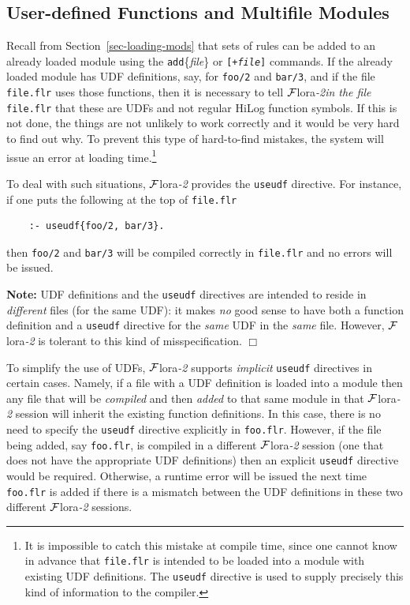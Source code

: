 \documentclass[11pt]{article}
\newcommand{\FLORA}{{\mbox{\sc ${\cal F}${lora}\rm\emph{-2}}}\xspace}
\newcommand{\FLSYSTEM}{\FLORA}
\newcommand{\flrext}{flr\xspace}
\begin{document}
\subsection{User-defined Functions and Multifile Modules}

Recall from Section~\ref{sec-loading-mods} that sets of rules can be added to 
an already loaded module using the \texttt{add}\{\emph{file}\}
or \texttt{[+\textnormal{\emph{file}}]}
commands.  
If the already loaded module has UDF definitions, say, for \texttt{foo/2}
and \texttt{bar/3}, and if 
the file \texttt{file.\flrext} uses those functions, then it is necessary to
tell \FLSYSTEM \emph{in the file}   \texttt{file.\flrext} that these are UDFs and not regular HiLog
function symbols. If this is not done, the things are not unlikely to work
correctly and it would be very hard to find out why.
To prevent this type of hard-to-find mistakes, the system
will issue an error at loading time.\footnote{
  It is impossible to catch this mistake at compile time, since one
  cannot know in advance that \texttt{file.\flrext} is intended to
  be loaded into a module with existing UDF definitions.
  The \texttt{useudf} directive is used to supply precisely this kind
  of information to the compiler.
  }

To deal with such situations, \FLSYSTEM provides the \texttt{useudf}
directive. For instance, if one puts the following at the top of
\texttt{file.\flrext}
\begin{verbatim}
    :- useudf{foo/2, bar/3}.
\end{verbatim}
then \texttt{foo/2} and \texttt{bar/3}
will be compiled correctly in \texttt{file.\flrext} and
no errors will be issued. 

\noindent
\textbf{Note:} UDF definitions and the \texttt{useudf} directives are intended
to reside in \emph{different} files (for the same UDF):
it makes \emph{no} good sense to have both a function definition and a
\texttt{useudf} directive for the \emph{same} UDF in the \emph{same}
file. However, \FLSYSTEM is tolerant to this kind of misspecification.
\hfill$\Box$

To simplify the use of UDFs, \FLSYSTEM supports \emph{implicit}
\texttt{useudf} directives in certain cases. Namely, if a file with
a UDF definition is loaded into a module then any file that will be
\emph{compiled} and then \emph{added} to that same module in that \FLSYSTEM session
will inherit the existing function definitions. In this case, there is no
need to specify the \texttt{useudf} directive explicitly in
\texttt{foo.\flrext}.
However, if the file being added, say \texttt{foo.\flrext},
is compiled in a different \FLSYSTEM session
(one that does not have the appropriate UDF definitions) then an explicit
\texttt{useudf} directive would be required. Otherwise, a runtime
error will be issued the next time \texttt{foo.\flrext} is added if there is a
mismatch between the UDF definitions in these two different \FLSYSTEM sessions. 
\end{document}
